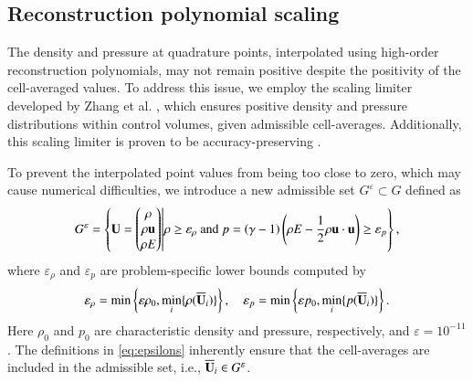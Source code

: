 \subsection{Reconstruction polynomial scaling}

\label{ssec:rec-pp-limiter}

The density and pressure at quadrature points, interpolated using high-order reconstruction polynomials, may not remain positive despite the positivity of the cell-averaged values. To address this issue, we employ the scaling limiter developed by Zhang et al. \cite{zhang2010maximum,zhang2010positivity,zhang2012positivity}, which ensures positive density and pressure distributions within control volumes, given admissible cell-averages. Additionally, this scaling limiter is proven to be accuracy-preserving \cite{zhang2010positivity}.


To prevent the interpolated point values from being too close to zero, which may cause numerical difficulties, we introduce a new admissible set $G^\varepsilon \subset G$ defined as
\begin{equation}
    G^\varepsilon= \left\{
    \mathbf{U} =  \begin{pmatrix}
        \rho \\ \rho \mathbf{u} \\ \rho E
    \end{pmatrix} \middle|
    \rho  \geq \varepsilon_\rho
    \text{ and }
    p=\left(\gamma-1\right) \left(\rho E - \dfrac{1}{2} \rho \mathbf{u} \cdot \mathbf{u}\right) \geq \varepsilon_p
    \right\},
\end{equation}
where $\varepsilon_\rho$ and $\varepsilon_p$ are problem-specific lower bounds computed by
\begin{equation}\label{eq:epsilons}
    \varepsilon_\rho=\min\left\{\varepsilon \rho_0, \min_i\{\rho(\overline{\mathbf{U}}_i)\}\right\}, \quad 
    \varepsilon_p=\min\left\{\varepsilon p_0, \min_i\{p(\overline{\mathbf{U}}_i)\}\right\}.
\end{equation}
Here $\rho_0$ and $p_0$ are characteristic density and pressure, respectively, and $\varepsilon=10^{-11}$. The definitions in \eqref{eq:epsilons} inherently ensure that the cell-averages are included in the admissible set, i.e., $\overline{\mathbf{U}}_i \in G^\varepsilon$.

